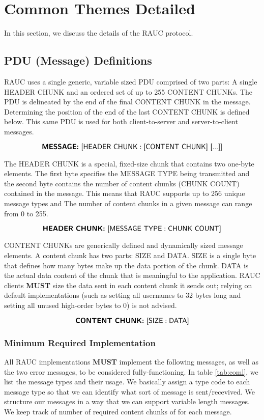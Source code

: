 

\section{Common Themes Detailed}
\label{sec:ct}

In this section, we discuss the details of the \textsf{RAUC} protocol.

\subsection{PDU (Message) Definitions}
RAUC uses a single generic, variable sized PDU comprised of two parts: A single HEADER CHUNK and an ordered set of up to 255 CONTENT CHUNKs. The PDU is delineated by the end of the final CONTENT CHUNK in the message. Determining the position of the end of the last CONTENT CHUNK is defined below. This same PDU is used for both client-to-server and server-to-client messages.

\[\textsf{\textbf{MESSAGE:} [HEADER CHUNK} : \textsf{[CONTENT CHUNK] [...]]}\]

The HEADER CHUNK is a special, fixed-size chunk that contains two one-byte elements. The first byte specifies the MESSAGE TYPE being transmitted and the second byte contains the number of content chunks (CHUNK COUNT) contained in the message. This means that RAUC supports up to 256 unique message types and The number of content chunks in a given message can range from 0 to 255.

\[\textsf{\textbf{HEADER CHUNK:} [MESSAGE TYPE} : \textsf{CHUNK COUNT]}\]

CONTENT CHUNKs are generically defined and dynamically sized message elements. A content chunk has two parts: SIZE and DATA. SIZE is a single byte that defines how many bytes make up the data portion of the chunk. DATA is the actual data content of the chunk that is meaningful to the application. RAUC clients \textbf{MUST} size the data sent in each content chunk it sends out; relying on default implementations (such as setting all usernames to 32 bytes long and setting all unused high-order bytes to 0) is not advised.

\[\textsf{\textbf{CONTENT CHUNK:} [SIZE} : \textsf{DATA]}\]



\subsubsection{Minimum Required Implementation}
All RAUC implementations \textbf{MUST} implement the following  messages, as well as the two error messages, to be considered fully-functioning. In table \ref{tab:coml}, we list the message types and their usage. We basically assign a type code to each message type so that we can identify what sort of message is sent/recevived. We structure our messages in a way that we can support variable length messages. We keep track of number of required content chunks of for each message. 

